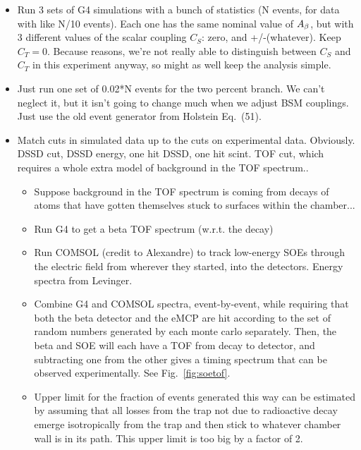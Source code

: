 \begin{itemize}
	\item Run 3 sets of G4 simulations with a bunch of statistics (N events, for data with like N/10 events).  Each one has the same nominal value of $A_{\beta}$, but with 3 different values of the scalar coupling $C_S$:  zero, and +/-(whatever).  Keep $C_T=0$.  Because reasons, we're not really able to distinguish between $C_S$ and $C_T$ in this experiment anyway, so might as well keep the analysis simple.
	\item Just run one set of 0.02*N events for the two percent branch.  We can't neglect it, but it isn't going to change much when we adjust BSM couplings.  Just use the old event generator from Holstein Eq.~(51).
	\item Match cuts in simulated data up to the cuts on experimental data.  Obviously.  DSSD cut, DSSD energy, one hit DSSD, one hit scint.  TOF cut, which requires a whole extra model of background in the TOF spectrum..
		\begin{itemize}
		\item Suppose background in the TOF spectrum is coming from decays of atoms that have gotten themselves stuck to surfaces within the chamber...
		\item Run G4 to get a beta TOF spectrum (w.r.t. the decay)
		\item Run COMSOL (credit to Alexandre) to track low-energy SOEs through the electric field from wherever they started, into the detectors.  Energy spectra from Levinger.
		\item Combine G4 and COMSOL spectra, event-by-event, while requiring that both the beta detector and the eMCP are hit according to the set of random numbers generated by each monte carlo separately.  Then, the beta and SOE will each have a TOF from decay to detector, and subtracting one from the other gives a timing spectrum that can be observed experimentally.  See Fig.~\ref{fig:soetof}.
		\item Upper limit for the fraction of events generated this way can be estimated by assuming that all losses from the trap not due to radioactive decay emerge isotropically from the trap and then stick to whatever chamber wall is in its path.  This upper limit is too big by a factor of 2.

\end{itemize}
\end{itemize}
